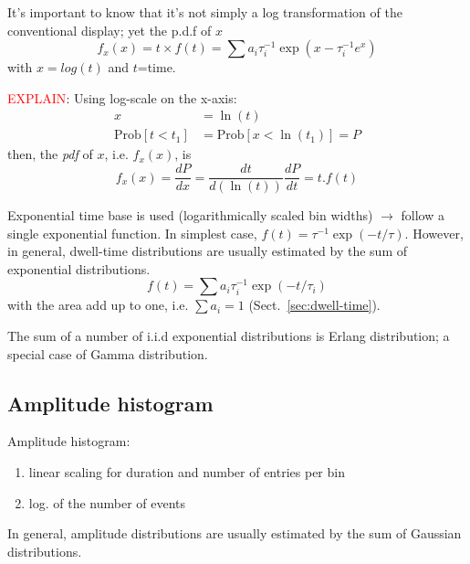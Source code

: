 It's important to know that it's not simply a log transformation of the
conventional display; yet the p.d.f of $x$
\begin{equation}
f_x(x)= t \times f(t) = \sum a_i \tau_i^{-1} \exp\left( x-\tau_i^{-1} e^x
\right)
\end{equation}
with $x=log(t)$ and $t$=time.

\textcolor{red}{EXPLAIN}: Using log-scale on the x-axis:
\begin{equation}
    \label{eq:831}
    \begin{split}
      x &= \ln(t) \\
      \text{Prob}[t<t_1] &= \text{Prob}[x < \ln(t_1)] = P
    \end{split}
  \end{equation}
  then, the {\it pdf} of $x$, i.e. $f_x(x)$, is
  \begin{equation}
    \label{eq:832}
    f_x(x) = \frac{dP}{dx} = \frac{dt}{d(\ln(t))}\frac{dP}{dt} = t.f(t)
  \end{equation}

Exponential time base is used (logarithmically scaled bin widths) $\rightarrow$
follow a single exponential function. In simplest case, $f(t) = \tau^{-1}
\exp(-t/\tau)$.  However, in general, dwell-time distributions are usually
estimated by the sum of exponential distributions.
\begin{equation}
  \label{eq:833}
  f(t) = \sum a_i \tau_i^{-1} \exp(-t/\tau_i)
\end{equation}
with the area add up to one, i.e.  $\sum a_i = 1$
(Sect.~\ref{sec:dwell-time}).

\begin{framed}
  The sum of a number of i.i.d exponential distributions is Erlang
  distribution; a special case of Gamma distribution.
\end{framed}

\subsection{Amplitude histogram}
\label{sec:amplitude-histogram}

Amplitude histogram:
\begin{enumerate}
\item linear scaling for duration and number of entries per bin
\item log. of the number of events
\end{enumerate}
In general, amplitude distributions are usually estimated by the sum
of Gaussian distributions.

